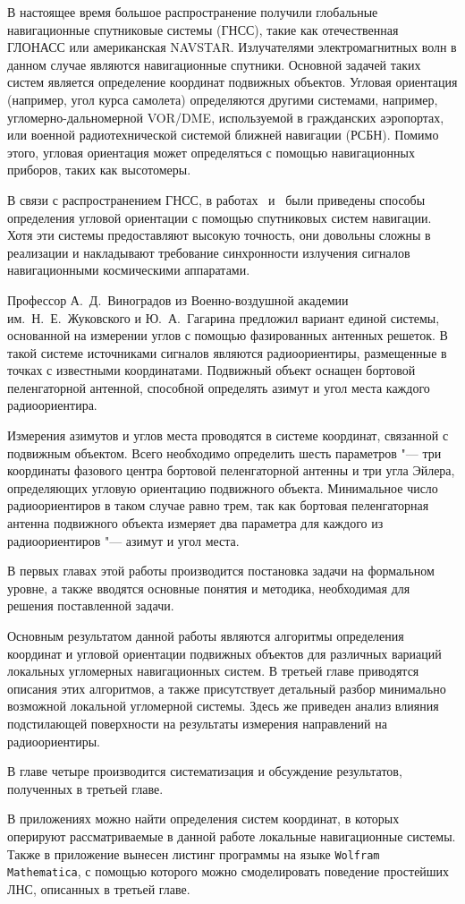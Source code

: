 \documentclass[../main.tex]{subfiles}
\begin{document}
В настоящее время большое распространение получили глобальные навигационные спутниковые системы (ГНСС), такие как отечественная ГЛОНАСС или американская NAVSTAR. Излучателями электромагнитных волн в данном случае являются навигационные спутники. Основной задачей таких систем является определение координат подвижных объектов. Угловая ориентация (например, угол курса самолета) определяются другими системами, например, угломерно-дальномерной VOR/DME, используемой в гражданских аэропортах, или военной радиотехнической системой ближней навигации (РСБН). Помимо этого, угловая ориентация может определяться с помощью навигационных приборов, таких как высотомеры.

В связи с распространением ГНСС, в работах~\cite{KORNEV:2016} и~\cite{STEPANOV:2006} были приведены способы определения угловой ориентации с помощью спутниковых систем навигации. Хотя эти системы предоставляют высокую точность, они довольны сложны в реализации и накладывают требование синхронности излучения сигналов навигационными космическими аппаратами.

Профессор А.~Д.~Виноградов из Военно-воздушной академии им.~Н.~Е.~Жуковского и Ю.~А.~Гагарина предложил вариант единой системы, основанной на измерении углов с помощью фазированных антенных решеток. В такой системе источниками сигналов являются радиоориентиры, размещенные в точках с известными координатами. Подвижный объект оснащен бортовой пеленгаторной антенной, способной определять азимут и угол места каждого радиоориентира.

Измерения азимутов и углов места проводятся в системе координат, связанной с подвижным объектом. Всего необходимо определить шесть параметров "--- три координаты фазового центра бортовой пеленгаторной антенны и три угла Эйлера, определяющих угловую ориентацию подвижного объекта. Минимальное число радиоориентиров в таком случае равно трем, так как бортовая пеленгаторная антенна подвижного объекта измеряет два параметра для каждого из радиоориентиров "--- азимут и угол места.

В первых главах этой работы производится постановка задачи на формальном уровне, а также вводятся основные понятия и методика, необходимая для решения поставленной задачи.

Основным результатом данной работы являются алгоритмы определения координат и угловой ориентации подвижных объектов для различных вариаций локальных угломерных навигационных систем. В третьей главе приводятся описания этих алгоритмов, а также присутствует детальный разбор минимально возможной локальной угломерной системы. Здесь же приведен анализ влияния подстилающей поверхности на результаты измерения направлений на радиоориентиры.

В главе четыре производится систематизация и обсуждение результатов, полученных в третьей главе.

В приложениях можно найти определения систем координат, в которых оперируют рассматриваемые в данной работе локальные навигационные системы. Также в приложение вынесен листинг программы на языке \texttt{Wolfram Mathematica}, с помощью которого можно смоделировать поведение простейших ЛНС, описанных в третьей главе.
\end{document}
